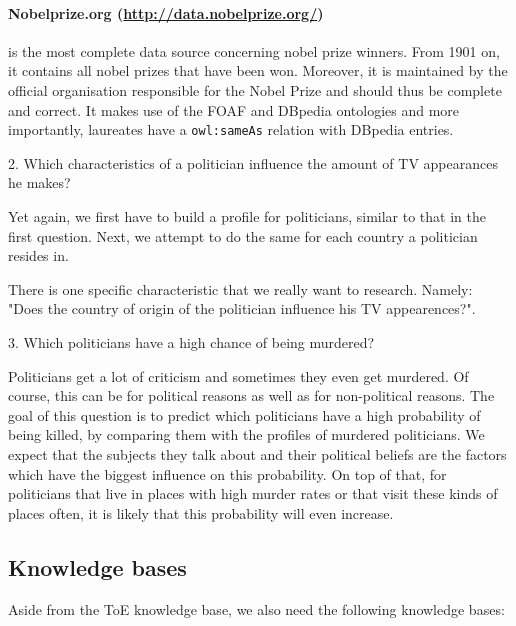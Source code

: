 \documentclass[12pt,a4paper]{article}
\begin{document}
\paragraph{\textbf{Nobelprize.org} (\url{http://data.nobelprize.org/})} is the most complete data source concerning nobel prize winners. From 1901 on, it contains all nobel prizes that have been won. Moreover, it is maintained by the official organisation responsible for the Nobel Prize and should thus be complete and correct. It makes use of the FOAF and DBpedia ontologies and more importantly, laureates have a \texttt{owl:sameAs} relation with DBpedia entries.
\vspace{1cm}

\begin{center}
	\Large
2. Which characteristics of a politician influence the amount of TV appearances he makes?
\end{center}

Yet again, we first have to build a profile for politicians, similar to that in the first question. Next, we attempt to do the same for each country a politician resides in.


There is one specific characteristic that we really want to research. Namely: "Does the country of origin of the politician influence his TV appearences?". 

\begin{center}
	\Large
3. Which politicians have a high chance of being murdered?
\end{center}

Politicians get a lot of criticism and sometimes they even get murdered. Of course, this can be for political reasons as well as for non-political reasons. The goal of this question is to predict which politicians have a high probability of being killed, by comparing them with the profiles of murdered politicians. We expect that the subjects they talk about and their political beliefs are the factors which have the biggest influence on this probability. On top of that, for politicians that live in places with high murder rates or that visit these kinds of places often, it is likely that this probability will even increase.  

\subsection*{Knowledge bases}

Aside from the ToE knowledge base, we also need the following knowledge bases:
\end{document}
